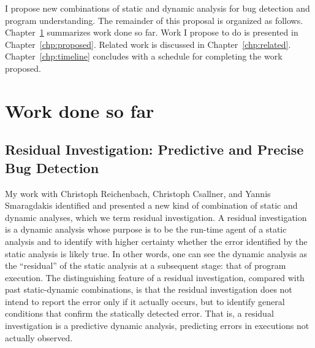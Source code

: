 \documentclass[proposal]{umthesis} %
\begin{document}
I propose new combinations of static and dynamic analysis for bug detection and program understanding.  The remainder of this proposal is organized as follows.  Chapter~\ref{chp:worksofar} summarizes work done so far.  Work I propose to do is presented in Chapter~\ref{chp:proposed}.  Related work is discussed in Chapter~\ref{chp:related}.  Chapter~\ref{chp:timeline} concludes with a schedule for completing the work proposed.   


\chapter{Work done so far}
\label{chp:worksofar}

\section{Residual Investigation: Predictive and Precise Bug Detection}

My work\cite{rfbi-issta12} with Christoph Reichenbach, Christoph Csallner, and Yannis Smaragdakis identified and presented a new kind of combination of static and dynamic analyses, which we term residual investigation. A residual investigation is a dynamic analysis whose purpose is to be the run-time agent of a static analysis and to identify with higher certainty whether the error identified by the static analysis is likely true.  In other words, one can see the dynamic analysis as the “residual” of the static analysis at a subsequent stage: that of program execution. The distinguishing feature of a residual investigation, compared with past static-dynamic combinations, is that the residual investigation does not intend to report the error only if it actually occurs, but to identify general conditions that confirm the statically detected error. That is, a residual investigation is a predictive dynamic analysis, predicting errors in executions not actually observed.
\end{document}
